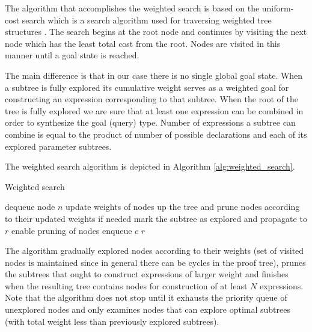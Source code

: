 The algorithm that accomplishes the weighted search is based on the uniform-cost search which is a search algorithm used for traversing weighted tree structures \cite{russel2003ai}.
The search begins at the root node and continues by visiting the next node which has the least total cost from the root.
Nodes are visited in this manner until a goal state is reached.


The main difference is that in our case there is no single global goal state.
When a subtree is fully explored its cumulative weight serves as a weighted goal for constructing an expression corresponding to that subtree.
When the root of the tree is fully explored we are sure that at least one expression can be combined in order to synthesize the goal (query) type.
Number of expressions a subtree can combine is equal to the product of number of possible declarations and each of its explored parameter subtrees.

The weighted search algorithm is depicted in Algorithm \ref{alg:weighted_search}.

\begin{algorithm}[ht]
\caption{Weighted search}
\label{alg:weighted_search}
\begin{algorithmic}[1]



\STATE dequeue node $n$
\STATE update weights of nodes up the tree and prune nodes according to their updated weights if needed
\STATE mark the subtree as explored and propagate to $r$
\STATE enable pruning of nodes
\ENDIF
\ENDIF
{}
\STATE enqueue $c$
\ENDIF
\ENDFOR
\ENDIF
\ENDWHILE
\RETURN $r$
\end{algorithmic}
\end{algorithm}

The algorithm gradually explored nodes according to their weights (set of visited nodes is maintained since in general there can be cycles in the proof tree), prunes the subtrees that ought to construct expressions of larger weight and finishes when the resulting tree contains nodes for construction of at least $N$ expressions.
Note that the algorithm does not stop until it exhausts the priority queue of unexplored nodes and only examines nodes that can explore optimal subtrees (with total weight less than previously explored subtrees).

